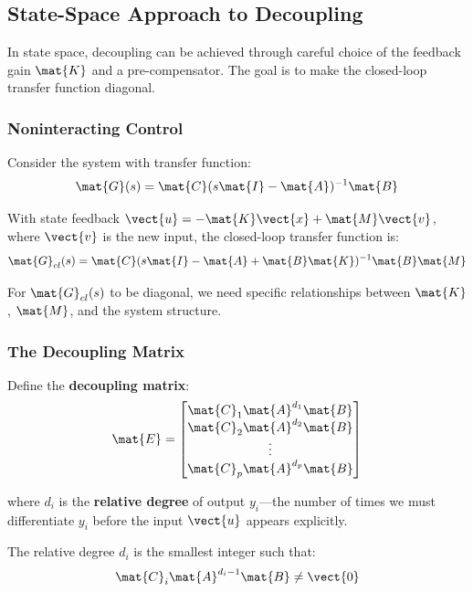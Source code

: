 \subsection{State-Space Approach to Decoupling}

In state space, decoupling can be achieved through careful choice of the feedback gain $\mat{K}$ and a pre-compensator. The goal is to make the closed-loop transfer function diagonal.

\subsubsection{Noninteracting Control}

Consider the system with transfer function:
\begin{equation}
\mat{G}(s) = \mat{C}(s\mat{I} - \mat{A})^{-1}\mat{B}
\end{equation}

With state feedback $\vect{u} = -\mat{K}\vect{x} + \mat{M}\vect{v}$, where $\vect{v}$ is the new input, the closed-loop transfer function is:
\begin{equation}
\mat{G}_{cl}(s) = \mat{C}(s\mat{I} - \mat{A} + \mat{B}\mat{K})^{-1}\mat{B}\mat{M}
\end{equation}

For $\mat{G}_{cl}(s)$ to be diagonal, we need specific relationships between $\mat{K}$, $\mat{M}$, and the system structure.

\subsubsection{The Decoupling Matrix}

Define the \textbf{decoupling matrix}:
\begin{equation}
\mat{E} = \begin{bmatrix}
\mat{C}_1\mat{A}^{d_1}\mat{B} \\
\mat{C}_2\mat{A}^{d_2}\mat{B} \\
\vdots \\
\mat{C}_p\mat{A}^{d_p}\mat{B}
\end{bmatrix}
\label{eq:decoupling_matrix}
\end{equation}

where $d_i$ is the \textbf{relative degree} of output $y_i$---the number of times we must differentiate $y_i$ before the input $\vect{u}$ appears explicitly.

The relative degree $d_i$ is the smallest integer such that:
\begin{equation}
\mat{C}_i\mat{A}^{d_i-1}\mat{B} \neq \vect{0}
\end{equation}

